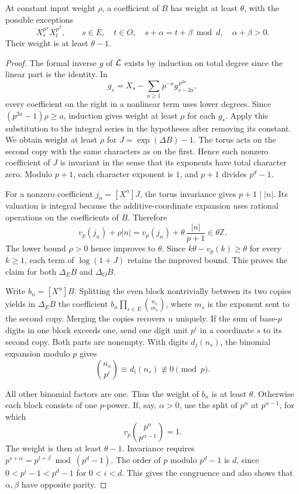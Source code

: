 \begin{lemma}\label{lem:two-differences}
At constant input weight \(\rho\), a coefficient of \(B\) has
weight at least \(\theta\), with the possible exceptions
\[
 X_s^{p^\alpha}X_t^{p^\beta},\qquad
 s\in E,\quad t\in O,\quad s+\alpha=t+\beta\bmod d,\quad
 \alpha+\beta>0 .
\]
Their weight is at least \(\theta-1\).
\end{lemma}
\begin{proof}
The formal inverse \(g\) of \({\cal L}\) exists by induction on
total degree since the linear part is the identity. In
\[
 g_s=X_s-\sum_{a\ge1}p^{-a}g_{s-2a}^{\,p^{2a}},
\]
every coefficient on the right in a nonlinear term uses
lower degrees. Since \((p^{2a}-1)\rho\ge a\), induction gives
weight at least \(\rho\) for each \(g_s\). Apply this substitution
to the integral series in the hypotheses after removing its
constant. We obtain weight at least \(\rho\) for
\(J=\exp(\Delta B)-1\). The torus acts on the second copy with
the same characters as on the first. Hence each nonzero
coefficient of \(J\) is invariant in the sense that its
exponents have total character zero. Modulo \(p+1\), each
character exponent is \(1\), and \(p+1\) divides \(p^d-1\).

For a nonzero coefficient \(j_n=[X^n]J\), the torus invariance
gives \(p+1\mid|n|\). Its valuation is integral because the
additive-coordinate expansion uses rational operations on the
coefficients of \(B\). Therefore
\[
 v_p(j_n)+\rho|n|
     =v_p(j_n)+\theta\,\frac{|n|}{p+1}
     \in \theta\mathbb Z .
\]
The lower bound \(\rho>0\) hence improves to \(\theta\).
Since \(k\theta-v_p(k)\ge\theta\) for every \(k\ge1\), each
term of \(\log(1+J)\) retains the improved bound. This proves
the claim for both \(\Delta_E B\) and \(\Delta_O B\).

Write \(b_n=[X^n]B\). Splitting the even block nontrivially
between its two copies yields in \(\Delta_E B\) the coefficient
\(b_n\prod_{s\in E}\binom{n_s}{m_s}\), where \(m_s\) is the
exponent sent to the second copy. Merging the copies recovers
\(n\) uniquely. If the sum of base-\(p\) digits in one block exceeds one,
send one digit unit \(p^i\) in a coordinate \(s\) to its second
copy. Both parts are nonempty. With digits \(d_j(n_s)\), the
binomial expansion modulo \(p\) gives
\[
   \binom{n_s}{p^i}\equiv d_i(n_s)\not\equiv0\pmod p .
\]

All other binomial factors are one. Thus the weight of \(b_n\)
is at least \(\theta\). Otherwise each block consists of one
\(p\)-power. If, say, \(\alpha>0\), use the split of \(p^\alpha\)
at \(p^{\alpha-1}\), for which
\[
   v_p\binom{p^\alpha}{p^{\alpha-1}}=1 .
\]
The weight is then at least \(\theta-1\). Invariance requires
\(p^{s+\alpha}=p^{t+\beta}\bmod (p^d-1)\).
The order of \(p\) modulo \(p^d-1\) is \(d\), since
\(0<p^i-1<p^d-1\) for \(0<i<d\). This gives the congruence
and also shows that \(\alpha,\beta\) have opposite parity.
\end{proof}

